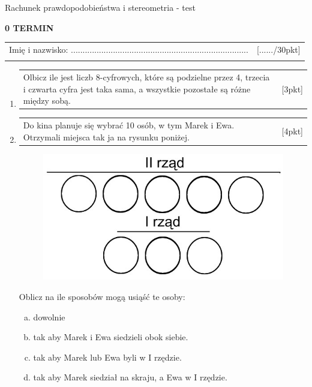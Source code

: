\documentclass[12pt,a4paper]{article}
\begin{document}
	\begin{center}
		\LARGE Rachunek prawdopodobieństwa i stereometria - test
	\end{center}
	\vspace{1.5cm}
	\begin{flushright}
		\textbf{0 TERMIN}
	\end{flushright}
	\begin{tabular}{p{13cm} r}
		Imię i nazwisko: ............................................................................
		&[....../30pkt]\\ 
		\vspace{0.5cm}
	\end{tabular}
	\begin{enumerate}[1.]
		\item  \begin{tabular}{p{13cm} r}
			Olbicz ile jest liczb  8-cyfrowych, które są podzielne przez 4, trzecia i czwarta cyfra jest taka sama, a wszystkie pozostałe są różne między sobą.&[3pkt]\\ 
		\end{tabular}
	
		\item  \begin{tabular}{p{13cm} r}
			Do kina planuje się wybrać 10 osób, w tym Marek i Ewa. Otrzymali miejsca tak ja na rysunku poniżej.&[4pkt]\\ 
		\end{tabular}
	
		\begin{figure}[h]
			\centering
			\includegraphics[scale=0.4]{rpst1.jpeg}
		\end{figure}
	
		Oblicz na ile sposobów mogą usiąść te osoby:
		\begin{enumerate}[a)]
			\item dowolnie
			\item tak aby Marek i Ewa siedzieli obok siebie.
			\item tak aby Marek lub Ewa byli w I rzędzie.
			\item tak aby Marek siedział na skraju, a Ewa w I rzędzie.
		\end{enumerate}
	

\end{enumerate}
\end{document}
